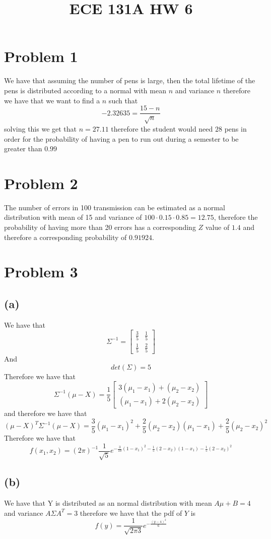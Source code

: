 
\title{ECE 131A HW 6}

\maketitle
\section*{Problem 1}
We have that assuming the number of pens is large, 
then the total lifetime of the pens is distributed according to
a normal with mean $n$ and variance $n$ therefore we have that we want
to find a $n$ such that 
$$-2.32635=\frac{15-n}{\sqrt{n}}$$
solving this we get that $n=27.11$ therefore the student would need
$\boxed{28}$ pens in order for the probability of having a pen 
to run out during a semester to be greater than $0.99$
\section*{Problem 2}
The number of errors in 100 transmission can be estimated
as a normal distribution with mean of 15 and variance of $100\cdot0.15\cdot0.85=12.75$,
therefore the probability of having more than 20 errors has a corresponding 
$Z$ value of $1.4$ and therefore a corresponding probability of
$\boxed{0.91924}$.
\section*{Problem 3}
\subsection*{(a)}
We have that 
$$\Sigma^{-1}=\begin{bmatrix}
\frac{3}{5}&\frac{1}{5}\\ \frac{1}{5}&\frac{2}{5}\end{bmatrix}$$
And 
$$det(\Sigma)=5$$
Therefore we have that 
$$\Sigma^{-1}(\mu-X)=\frac{1}{5}\begin{bmatrix}
    3(\mu_1-x_1)+(\mu_2-x_2)\\
    (\mu_1-x_1)+2(\mu_2-x_2)
\end{bmatrix}$$
and therefore we have that
$$(\mu-X)^T\Sigma^{-1}(\mu-X)=\frac{3}{5}(\mu_1-x_1)^2+\frac{2}{5}(\mu_2-x_2)(\mu_1-x_1)+\frac{2}{5}(\mu_2-x_2)^2$$
Therefore we have that
$$f(x_1,x_2)=(2\pi)^{-1}\frac{1}{\sqrt{5}}e^{-\frac{3}{10}(1-x_1)^2-\frac{1}{5}(2-x_2)(1-x_1)-\frac{1}{5}(2-x_2)^2}$$
\subsection*{(b)}
We have that Y is distributed as an normal distribution with 
mean $A\mu+B=4$ and variance $A\Sigma A^T=3$ therefore we have that
the pdf of $Y$ is 
$$f(y)=\frac{1}{\sqrt{2\pi3}}e^{-\frac{(y-4)^2}{6}}$$
